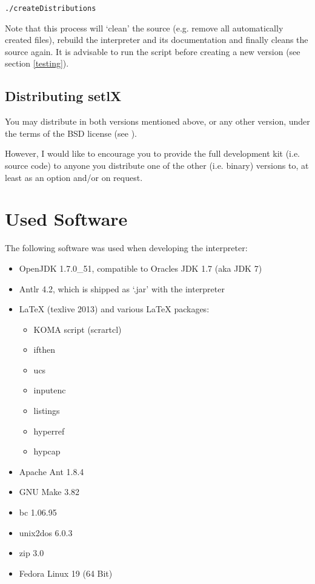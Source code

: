 \begin{lstlisting}[frame=none,numbers=none]
./createDistributions
\end{lstlisting}

Note that this process will `clean' the source (e.g. remove all automatically created files), rebuild the interpreter and its documentation and finally cleans the source again. It is advisable to run the  script before creating a new version (see section \ref{testing}).

\subsection{Distributing setlX}

You may distribute \setlX{} in both versions mentioned above, or any other version, under the terms of the BSD license (see ).

However, I would like to encourage you to provide the full development kit (i.e. source code) to anyone you distribute one of the other (i.e. binary) versions to, at least as an option and\slash{}or on request.

\section{Used Software}

The following software was used when developing the \setlX{} interpreter:

\begin{itemize}
	\item OpenJDK 1.7.0\_51, compatible to Oracles JDK 1.7 (aka JDK 7)
	\item Antlr 4.2, which is shipped as `.jar' with the interpreter
	\item \LaTeX{} (texlive 2013) and various \LaTeX{} packages:
		\begin{itemize}
			\item KOMA script (scrartcl)
			\item ifthen
			\item ucs
			\item inputenc
			\item listings
			\item hyperref
			\item hypcap
		\end{itemize}
	\item Apache Ant 1.8.4
	\item GNU Make 3.82
	\item bc 1.06.95
	\item unix2dos 6.0.3
	\item zip 3.0
	\item Fedora Linux 19 (64 Bit)
\end{itemize}


